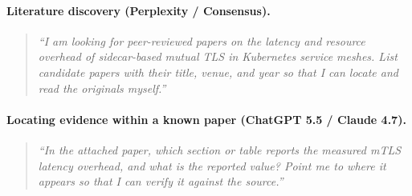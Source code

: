 \paragraph{Literature discovery (Perplexity / Consensus).}
\begin{quote}
\itshape ``I am looking for peer-reviewed papers on the latency and resource overhead of
sidecar-based mutual TLS in Kubernetes service meshes. List candidate papers with their
title, venue, and year so that I can locate and read the originals myself.''
\end{quote}

\paragraph{Locating evidence within a known paper (ChatGPT 5.5 / Claude 4.7).}
\begin{quote}
\itshape ``In the attached paper, which section or table reports the measured mTLS
latency overhead, and what is the reported value? Point me to where it appears so that I
can verify it against the source.''
\end{quote}
